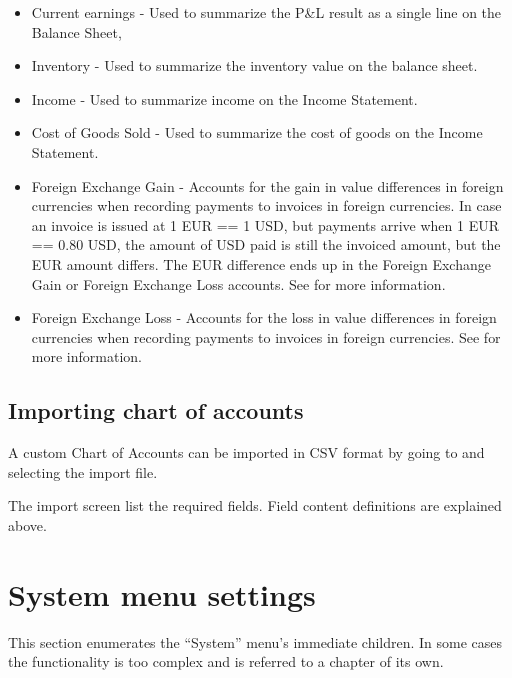 \begin{itemize}
    \item Current earnings - Used to summarize the P\&L result as a single line on the Balance Sheet,
    \item Inventory - Used to summarize the inventory value on the balance sheet.
    \item Income - Used to summarize income on the Income Statement.
    \item Cost of Goods Sold - Used to summarize the cost of goods on the Income Statement.
    \item Foreign Exchange Gain - Accounts for the gain in value differences in foreign currencies when recording payments to invoices in foreign currencies.
    In case an invoice is issued at 1 EUR == 1 USD, but payments arrive when 1 EUR == 0.80 USD, the amount of USD paid is still the invoiced amount, but the EUR amount differs. 
    The EUR difference ends up in the Foreign Exchange Gain or Foreign Exchange Loss accounts. See  for more information.
    \item Foreign Exchange Loss - Accounts for the loss in value differences in foreign currencies when recording payments to invoices in foreign currencies. See  for more information.
\end{itemize}

\subsection{Importing chart of accounts}
\label{subsec-coa-importing}

A custom Chart of Accounts can be imported in CSV format by going to  and selecting the import file.

The import screen list the required fields. Field content definitions are explained above.

\section{System menu settings}
\label{sec-company-config-system-menu}

This section enumerates the ``System'' menu's immediate children. In some cases the
functionality is too complex and is referred to a chapter of its own.

